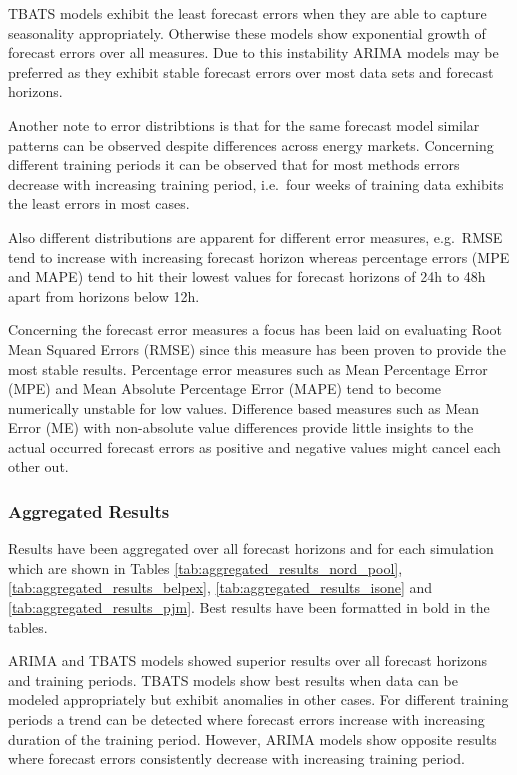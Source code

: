 TBATS models exhibit the least forecast errors when they are able to capture seasonality appropriately. Otherwise these models show exponential growth of forecast errors over all measures. Due to this instability ARIMA models may be preferred as they exhibit stable forecast errors over most data sets and forecast horizons. 

Another note to error distribtions is that for the same forecast model similar patterns can be observed despite differences across energy markets. Concerning different training periods it can be observed that for most methods errors decrease with increasing training period, i.e.~four weeks of training data exhibits the least errors in most cases. 

Also different distributions are apparent for different error measures, e.g.~RMSE tend to increase with increasing forecast horizon whereas percentage errors (MPE and MAPE) tend to hit their lowest values for forecast horizons of 24h to 48h apart from horizons below 12h. 

Concerning the forecast error measures a focus has been laid on evaluating Root Mean Squared Errors (RMSE) since this measure has been proven to provide the most stable results. Percentage error measures such as Mean Percentage Error (MPE) and Mean Absolute Percentage Error (MAPE) tend to become numerically unstable for low values. Difference based measures such as Mean Error (ME) with non-absolute value differences provide little insights to the actual occurred forecast errors as positive and negative values might cancel each other out. 



\subsubsection{Aggregated Results}

Results have been aggregated over all forecast horizons and for each simulation which are shown in Tables \ref{tab:aggregated_results_nord_pool}, \ref{tab:aggregated_results_belpex}, \ref{tab:aggregated_results_isone} and \ref{tab:aggregated_results_pjm}. Best results have been formatted in bold in the tables. 

ARIMA and TBATS models showed superior results over all forecast horizons and training periods. TBATS models show best results when data can be modeled appropriately but exhibit anomalies in other cases. For different training periods a trend can be detected where forecast errors increase with increasing duration of the training period. However, ARIMA models show opposite results where forecast errors consistently decrease with increasing training period. 


